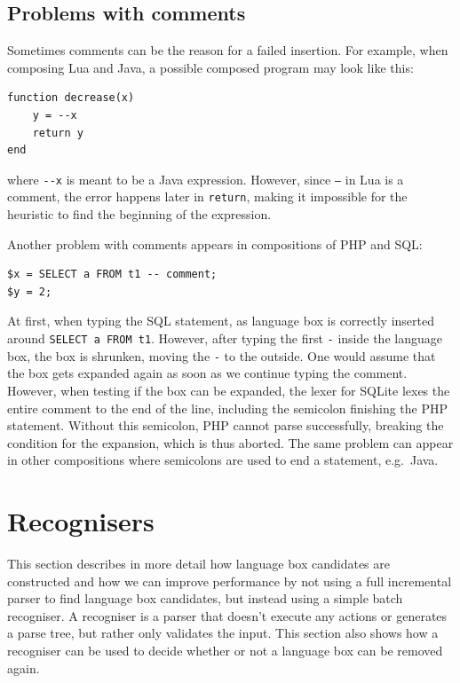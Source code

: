 \documentclass[sigplan,screen]{acmart}\settopmatter{printfolios=true,printccs=false,printacmref=false}
\begin{document}
\subsection{Problems with comments}

Sometimes comments can be the reason for a failed insertion. For example, when
composing Lua and Java, a possible composed program may look like this:

\begin{verbatim}
function decrease(x)
    y = --x
    return y
end
\end{verbatim}

where \verb|--x| is meant to be a Java expression. However, since \texttt{--}
in Lua is a comment, the error happens later in \texttt{return}, making it
impossible for the heuristic to find the beginning of the expression.

Another problem with comments appears in compositions of PHP and SQL:

\begin{verbatim}
$x = SELECT a FROM t1 -- comment;
$y = 2;
\end{verbatim}

At first, when typing the SQL statement, as language box is correctly inserted
around \verb|SELECT a FROM t1|. However, after typing the first \texttt{-}
inside the language box, the box is shrunken, moving the \texttt{-} to the
outside. One would assume that the box gets expanded again as soon as we
continue typing the comment. However, when testing if the box can be expanded,
the lexer for SQLite lexes the entire comment to the end of the line, including
the semicolon finishing the PHP statement. Without this semicolon, PHP cannot
parse successfully, breaking the condition for the expansion, which is thus
aborted. The same problem can appear in other compositions where semicolons are
used to end a statement, e.g.~Java.

\section{Recognisers}
\label{sec:impl_defaultrec}

This section describes in more detail how language box candidates are
constructed and how we can improve performance by not using a full incremental
parser to find language box candidates, but instead using a simple batch
recogniser. A recogniser is a parser that doesn't execute any actions or
generates a parse tree, but rather only validates the input. This section also
shows how a recogniser can be used to decide whether or not a language box can
be removed again.
\end{document}
